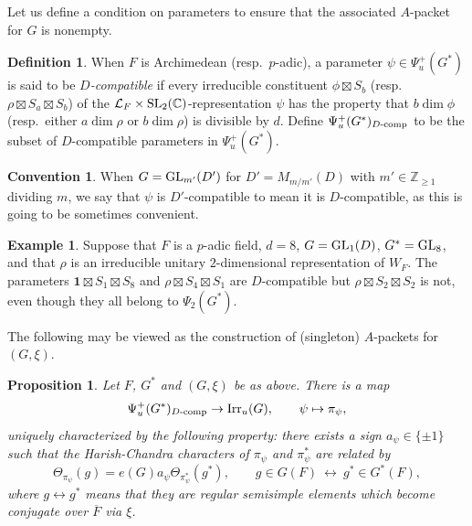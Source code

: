 \documentclass[11pt,reqno]{amsart}
\theoremstyle{plain}
\newtheorem{prop}[thm]{Proposition}
\theoremstyle{definition}
\newtheorem{defn}[thm]{Definition}
\newtheorem{ex}[thm]{Example}
\newtheorem{conv}[thm]{Convention}
\newcommand{\Z}{\mathbb{Z}}
\newcommand{\C}{\mathbb{C}}
\renewcommand{\cL}{\mathcal{L}}
\newcommand{\SL}{\tu{SL}}
\newcommand{\GL}{\tu{GL}}
\newcommand{\Irr}{\tu{Irr}}
\newcommand{\tu}{\textup}
\newcommand{\ol}{\overline}
\numberwithin{equation}{subsection}
\begin{document}
Let us define a condition on parameters to ensure that the associated $A$-packet for $G$ is nonempty.

\begin{defn}\label{def:D-compatible}
When $F$ is Archimedean (resp.~$p$-adic),
a parameter $\psi\in \Psi^+_u(G^*)$ is said to be \emph{$D$-compatible} if every irreducible constituent $\phi\boxtimes S_b$ (resp.~$\rho\boxtimes S_a\boxtimes S_b$) of the $\cL_F\times \SL_2(\C)$-representation $\psi$ has the property that $b\dim \phi$ (resp.~either $a\dim \rho$ or $b\dim \rho$) is divisible by $d$. 
Define $\Psi^+_u(G^*)_{D\tu{-comp}}$ to be the subset of $D$-compatible parameters in $\Psi^+_u(G^*)$.
\end{defn}

\begin{conv}\label{convention:D-compatible}
When $G=\GL_{m'}(D')$ for $D'=M_{m/m'}(D)$ with $m'\in \Z_{\ge1}$ dividing $m$, we say that $\psi$ is $D'$-compatible to mean it is $D$-compatible, as this is going to be sometimes convenient.
\end{conv}

\begin{ex}
Suppose that $F$ is a $p$-adic field, $d=8$, $G=\GL_1(D)$, $G^*=\GL_8$, and that
$\rho$ is an irreducible unitary $2$-dimensional representation of $W_F$.
The parameters $\textbf{1}\boxtimes S_1 \boxtimes S_8$ and $\rho\boxtimes S_4\boxtimes S_1$ are $D$-compatible but $\rho\boxtimes S_2\boxtimes S_2$ is not, even though they all belong to $\Psi_2(G^*)$.
\end{ex}

The following may be viewed as the construction of (singleton) $A$-packets for $(G,\xi)$.

\begin{prop}\label{prop:local-JL}
Let $F$, $G^*$ and $(G,\xi)$ be as above. There is a map
\begin{equation}\label{eq:JL-for-A-parameters}
    \Psi^+_u(G^*)_{D\tu{-comp}}\to \Irr_u(G),\qquad \psi\mapsto \pi_\psi,
\end{equation}
uniquely characterized by the following property: there exists a sign $a_\psi\in \{\pm1\}$ such that the Harish-Chandra characters of $\pi_\psi$ and $\pi^*_\psi$ are related by
\[
\Theta_{\pi_\psi}(g)=e(G)a_\psi\Theta_{\pi^*_\psi}(g^*),\qquad g\in G(F)~\leftrightarrow~g^*\in G^*(F),
\]
where $g\leftrightarrow g^*$ means that they are regular semisimple elements which become conjugate over $\ol F$ via $\xi$.
\end{prop}
\end{document}
